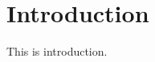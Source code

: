 \documentclass[../Paper.tex]{subfiles}
\begin{document}
\section{Introduction}	

This is introduction.
\end{document}
